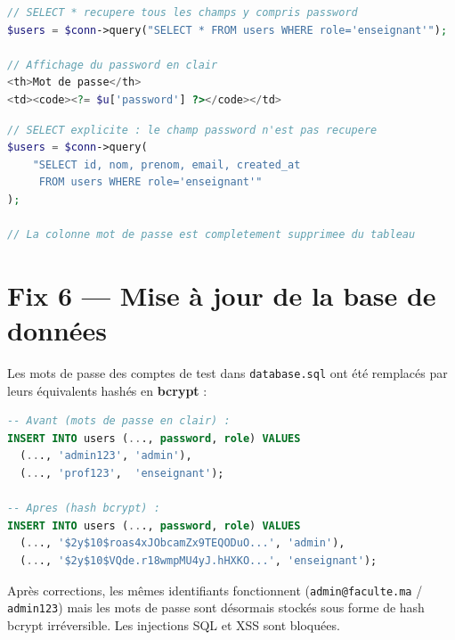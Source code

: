 ﻿\documentclass[12pt,a4paper]{report}
\begin{document}
\begin{lstlisting}[language=PHP, caption={Avant --- mot de passe exposé}]
// SELECT * recupere tous les champs y compris password
$users = $conn->query("SELECT * FROM users WHERE role='enseignant'");

// Affichage du password en clair
<th>Mot de passe</th>
<td><code><?= $u['password'] ?></code></td>
\end{lstlisting}

\begin{lstlisting}[language=PHP, caption={Après --- mot de passe exclu}]
// SELECT explicite : le champ password n'est pas recupere
$users = $conn->query(
    "SELECT id, nom, prenom, email, created_at
     FROM users WHERE role='enseignant'"
);

// La colonne mot de passe est completement supprimee du tableau
\end{lstlisting}

\section{Fix 6 --- Mise à jour de la base de données}

Les mots de passe des comptes de test dans \texttt{database.sql} ont été remplacés par
leurs équivalents hashés en \textbf{bcrypt} :

\begin{lstlisting}[language=SQL, caption={database.sql mis à jour}]
-- Avant (mots de passe en clair) :
INSERT INTO users (..., password, role) VALUES
  (..., 'admin123', 'admin'),
  (..., 'prof123',  'enseignant');

-- Apres (hash bcrypt) :
INSERT INTO users (..., password, role) VALUES
  (..., '$2y$10$roas4xJObcamZx9TEQODuO...', 'admin'),
  (..., '$2y$10$VQde.r18wmpMU4yJ.hHXKO...', 'enseignant');
\end{lstlisting}

\begin{successbox}[Résultat]
Après corrections, les mêmes identifiants fonctionnent (\texttt{admin@faculte.ma} /
\texttt{admin123}) mais les mots de passe sont désormais stockés sous forme de hash bcrypt
irréversible. Les injections SQL et XSS sont bloquées.
\end{successbox}

\newpage

\end{document}
